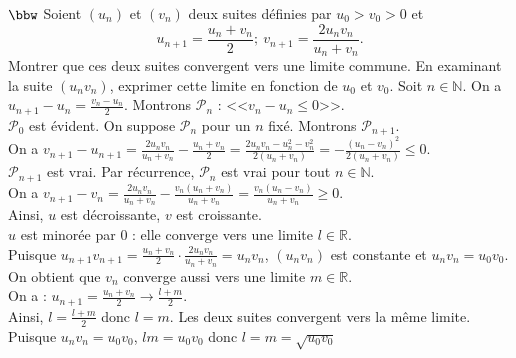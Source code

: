 \documentclass[11pt]{article}
\begin{document}
\begin{exercice}{$\bbw$}{}
    Soient $(u_n)$ et $(v_n)$ deux suites définies par $u_0 > v_0 > 0$ et
    \begin{equation*}
        u_{n+1} = \frac{u_n + v_n}{2}; ~ v_{n+1} = \frac{2u_nv_n}{u_n + v_n}.
    \end{equation*}
    Montrer que ces deux suites convergent vers une limite commune. En examinant la suite $(u_nv_n)$, exprimer cette limite en fonction de $u_0$ et $v_0$.
    \tcblower
    Soit $n\in\mathbb{N}$. On a $u_{n+1} - u_n = \frac{v_n - u_n}{2}$. Montrons $\mathcal{P}_n$ : <<$v_n-u_n \leq 0$>>.\\
    $\mathcal{P}_0$ est évident. On suppose $\mathcal{P}_n$ pour un $n$ fixé. Montrons $\mathcal{P}_{n+1}$.\\
    On a $v_{n+1} - u_{n+1} = \frac{2u_nv_n}{u_n+v_n} - \frac{u_n+v_n}{2} = \frac{2u_nv_n - u_n^2 - v_n^2}{2(u_n + v_n)}=-\frac{(u_n - v_n)^2}{2(u_n + v_n)}\leq0$.\\
    $\mathcal{P}_{n+1}$ est vrai. Par récurrence, $\mathcal{P}_n$ est vrai pour tout $n\in\mathbb{N}$.\\
    On a $v_{n+1} - v_n = \frac{2u_nv_n}{u_n+v_n} - \frac{v_n(u_n + v_n)}{u_n + v_n}=\frac{v_n(u_n - v_n)}{u_n + v_n}\geq0$.\\
    Ainsi, $u$ est décroissante, $v$ est croissante.\\
    $u$ est minorée par $0$ : elle converge vers une limite $l\in\mathbb{R}$.\\
    Puisque $u_{n+1}v_{n+1} = \frac{u_n+v_n}{2}\cdot\frac{2u_nv_n}{u_n+v_n}=u_nv_n$, $(u_nv_n)$ est constante et $u_nv_n = u_0v_0$.\\
    On obtient que $v_n$ converge aussi vers une limite $m\in\mathbb{R}$.\\
    On a : $u_{n+1} = \frac{u_n + v_n}{2} \longrightarrow \frac{l + m}{2}$.\\
    Ainsi, $l = \frac{l + m}{2}$ donc $l = m$. Les deux suites convergent vers la même limite.\\
    Puisque $u_nv_n = u_0v_0$, $lm = u_0v_0$ donc $l = m = \sqrt{u_0v_0}$
\end{exercice}
\end{document}
